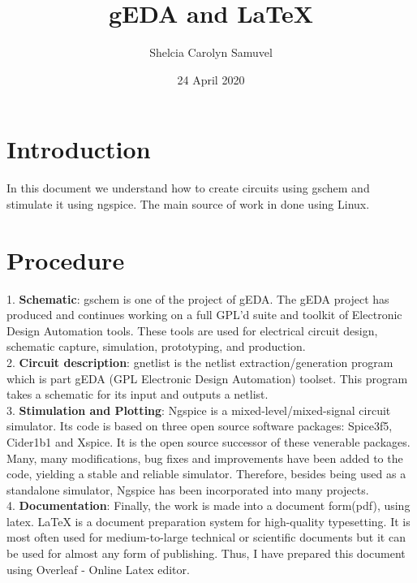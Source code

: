 \documentclass{article}
\title{gEDA and LaTeX}
\author{Shelcia Carolyn Samuvel }
\date{24 April 2020}
\begin{document}
\maketitle

\section{Introduction}
In this document we understand how to create circuits using gschem and stimulate it using ngspice. The main source of work in done using Linux.

\section{Procedure}
1. \textbf{Schematic}: gschem is one of the project of gEDA. The gEDA project has produced and continues working on a full GPL'd suite and toolkit of Electronic Design Automation tools. These tools are used for electrical circuit design, schematic capture, simulation, prototyping, and production. \\
2. \textbf{Circuit description}: gnetlist is the netlist extraction/generation program which is part gEDA (GPL Electronic Design Automation) toolset. This program takes a schematic for its input and outputs a netlist. \\
3. \textbf{Stimulation and Plotting}: Ngspice is a mixed-level/mixed-signal circuit simulator. Its code is based on three open source software packages: Spice3f5, Cider1b1 and Xspice. It is the open source successor of these venerable packages. Many, many modifications, bug fixes and improvements have been added to the code, yielding a stable and reliable simulator. Therefore, besides being used as a standalone simulator, Ngspice has been incorporated into many projects. \\
4. \textbf{Documentation}: Finally, the work is made into a document form(pdf), using latex. LaTeX is a document preparation system for high-quality typesetting. It is most often used for medium-to-large technical or scientific documents but it can be used for almost any form of publishing. Thus, I have prepared this document using Overleaf - Online Latex editor.

\newpage
\end{document}
